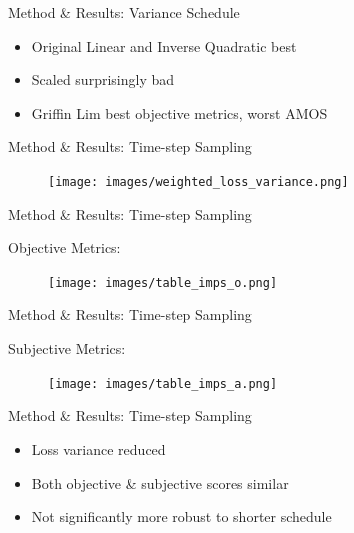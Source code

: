 \documentclass{beamer}
\begin{document}

\begin{frame}{Method \& Results: Variance Schedule}

    \begin{itemize}
        \setlength\itemsep{1.5em}
        \item Original Linear and Inverse Quadratic best
        \pause
        \item Scaled surprisingly bad
        \pause
        \item Griffin Lim best objective metrics, worst AMOS
    \end{itemize}
\end{frame}


\begin{frame}{Method \& Results: Time-step Sampling}

    \begin{figure}
        \centering
        \texttt{[image: images/weighted\_loss\_variance.png]}
    \end{figure}

\end{frame}


\begin{frame}{Method \& Results: Time-step Sampling}

Objective Metrics:

    \begin{figure}[H]
        \centering
        \texttt{[image: images/table\_imps\_o.png]}
    \end{figure} 

\end{frame}


\begin{frame}{Method \& Results: Time-step Sampling}

Subjective Metrics:

    \begin{figure}[H]
        \centering
        \texttt{[image: images/table\_imps\_a.png]}
    \end{figure}

\end{frame}


\begin{frame}{Method \& Results: Time-step Sampling}

    \begin{itemize}
        \setlength\itemsep{1.5em}
        \item Loss variance reduced
        \pause
        \item Both objective \& subjective scores similar
        \pause
        \item Not significantly more robust to shorter schedule
    \end{itemize}

\end{frame}
\end{document}
